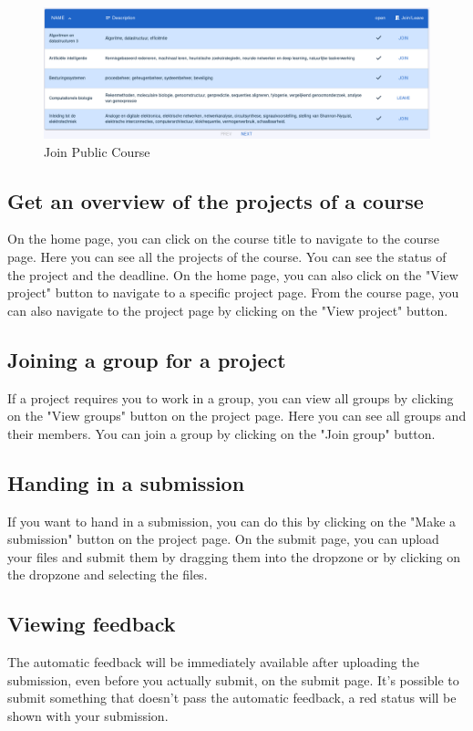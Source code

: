 \documentclass{article}
\begin{document}
\begin{figure}[H]
    \centering
    \includegraphics[width=0.5\linewidth]{user_manual//images/join_public.png}
    \caption{Join Public Course}
    \label{fig:join_public_course}
\end{figure}

\subsection{Get an overview of the projects of a course}
On the home page, you can click on the course title to navigate to the course page. Here you can see all the projects of the course. You can see the status of the project and the deadline.
On the home page, you can also click on the "View project" button to navigate to a specific project page.
From the course page, you can also navigate to the project page by clicking on the "View project" button.

\subsection{Joining a group for a project}
If a project requires you to work in a group, you can view all groups by clicking on the "View groups" button on the project page. Here you can see all groups and their members. You can join a group by clicking on the "Join group" button.

\subsection{Handing in a submission}
If you want to hand in a submission, you can do this by clicking on the "Make a submission" button on the project page. On the submit page, you can upload your files and submit them by dragging them into the dropzone or by clicking on the dropzone and selecting the files.

\subsection{Viewing feedback}
The automatic feedback will be immediately available after uploading the submission, even before you actually submit, on the submit page. It's possible to submit something that doesn't pass the automatic feedback, a red status will be shown with your submission.
\end{document}
